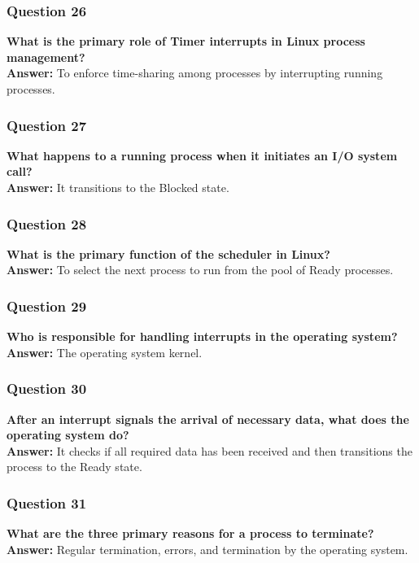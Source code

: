 \documentclass{article}
\begin{document}
\subsubsection*{Question 26}
\textbf{What is the primary role of Timer interrupts in Linux process management?} \\
\textbf{Answer:} To enforce time-sharing among processes by interrupting running processes.

\subsubsection*{Question 27}
\textbf{What happens to a running process when it initiates an I/O system call?} \\
\textbf{Answer:} It transitions to the Blocked state.

\subsubsection*{Question 28}
\textbf{What is the primary function of the scheduler in Linux?} \\
\textbf{Answer:} To select the next process to run from the pool of Ready processes.

\subsubsection*{Question 29}
\textbf{Who is responsible for handling interrupts in the operating system?} \\
\textbf{Answer:} The operating system kernel.

\subsubsection*{Question 30}
\textbf{After an interrupt signals the arrival of necessary data, what does the operating system do?} \\
\textbf{Answer:} It checks if all required data has been received and then transitions the process to the Ready state.

\subsubsection*{Question 31}
\textbf{What are the three primary reasons for a process to terminate?} \\
\textbf{Answer:} Regular termination, errors, and termination by the operating system.
\end{document}
